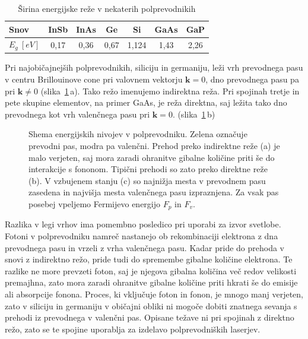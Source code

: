\begin{table}[h]
 \centering
\begin{tabular}{|l|c|c|c|c|c|c|} \hline  
      Snov & InSb & InAs & Ge & Si & GaAs & GaP \\ \hline
      $E_g~[\si{eV}]$ & 0,17 & 0,36 & 0,67 & 1,124 & 1,43 & 2,26  \\ \hline  
\end{tabular}
  \caption{Širina energijske reže v nekaterih polprevodnikih}
\label{table:gap}
\end{table}

Pri najobičajnejših polprevodnikih, siliciju in germaniju, leži vrh 
prevodnega pasu v centru Brillouinove cone pri valovnem vektorju $\mathbf{k}=0$, 
dno prevodnega pasu pa pri $\mathbf{k} \neq 0$ (slika~\ref{fig:Ek}\,a). 
Tako režo imenujemo indirektna
reža. Pri spojinah tretje in pete skupine elementov, na primer GaAs, je reža
direktna, saj ležita tako dno prevodnega kot vrh valenčnega pasu pri $\mathbf{k}=0$.
(slika~\ref{fig:Ek}\,b)

\begin{figure}[h]
\centering
\def\svgwidth{145truemm} 

\caption{Shema energijskih nivojev v polprevodniku. Zelena označuje prevodni
pas, modra pa valenčni. Prehod preko indirektne reže (a) je malo verjeten, 
saj mora zaradi ohranitve gibalne količine priti še do interakcije s fononom.
Tipični prehodi so zato preko direktne reže (b). V vzbujenem stanju (c) so 
najnižja mesta v prevodnem pasu zasedena in najvišja mesta valenčnega pasu
izpraznjena. Za vsak pas posebej vpeljemo Fermijevo energijo $F_p$ in $F_v$. 
}
\label{fig:Ek}
\end{figure}

Razlika v legi vrhov ima pomembno posledico pri uporabi za izvor svetlobe. Fotoni 
v polprevodniku namreč nastanejo ob rekombinaciji elektrona z dna prevodnega pasu
in vrzeli z vrha valenčnega pasu. Kadar pride do prehoda v snovi z indirektno režo, 
pride tudi do spremembe gibalne količine elektrona. Te razlike ne more prevzeti
foton, saj je njegova gibalna količina več redov velikosti premajhna, zato 
mora zaradi ohranitve gibalne količine priti hkrati še do emisije ali absorpcije 
fonona. Proces, ki vključuje foton in fonon, je mnogo manj verjeten, zato 
v siliciju in germaniju v običajni obliki ni mogoče dobiti znatnega sevanja 
s prehodi iz prevodnega v valenčni pas. Opisane težave ni pri spojinah z 
direktno režo, zato se te spojine uporablja za izdelavo polprevodniških laserjev. 

